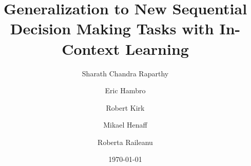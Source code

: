 \documentclass[]{fairmeta}
\title{Generalization to New Sequential Decision Making Tasks with In-Context Learning}
\author[1,*]{Sharath Chandra Raparthy}
\author[1]{Eric Hambro}
\author[1,2]{Robert Kirk}
\author[1,\dagger]{Mikael Henaff}
\author[1,2,\dagger]{Roberta Raileanu}
\affiliation[1]{FAIR at Meta}
\affiliation[2]{UCL}
\date{\today}
\begin{document}
\maketitle






% 


\clearpage
\newpage



\clearpage
\newpage
\beginappendix

% 
% 

% 
\end{document}
